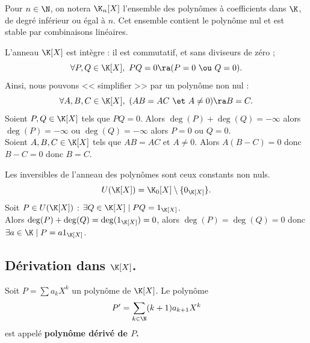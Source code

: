 \documentclass[11pt]{article}
\begin{document}
\vspace*{-0.8cm}

\begin{corr}{}{}
    Pour $n\in\N$, on notera $\K_n[X]$ l'ensemble des polynômes à coefficients dans $\K$, de degré inférieur ou égal à $n$. Cet ensemble contient le polynôme nul et est stable par combinaisons linéaires.
\end{corr}

\vspace*{-0.8cm}

\begin{corr}{}{}
    L'anneau $\K[X]$ est intègre : il est commutatif, et sans diviseurs de zéro ;
    \begin{equation*}
        \forall P,Q\in\K[X], ~ PQ=0 \ra (P=0 ~\ou~ Q=0).
    \end{equation*}
    Ainsi, nous pouvons << simplifier >> par un polynôme non nul :
    \begin{equation*}
        \forall A,B,C\in\K[X], ~ (AB=AC ~\et~ A\neq0) \ra B=C.
    \end{equation*}
    \tcblower
    Soient $P,Q\in\K[X]$ tels que $PQ=0$. Alors $\deg(P)+\deg(Q)=-\infty$ alors $\deg(P)=-\infty$ ou $\deg(Q)=-\infty$ alors $P=0$ ou $Q=0$.\\
    Soient $A,B,C\in\K[X]$ tels que $AB=AC$ et $A\neq0$. Alors $A(B-C)=0$ donc $B-C=0$ donc $B=C$.
\end{corr}

\begin{corr}{Les inversibles de l'anneau des polynômes sont ceux constants non nuls.}{}
    \begin{equation*}
        U(\K[X])=\K_0[X]\setminus\{0_{\K[X]}\}.
    \end{equation*}
    \tcblower
    Soit $P\in U(\K[X])$ : $\exists Q \in \K[X] \mid PQ=1_{\K[X]}$.\\
    Alors $\deg(P)+\deg(Q)=\deg(1_{\K[X]})=0$, alors $\deg(P)=\deg(Q)=0$ donc $\exists a \in \K \mid P=a1_{\K[X]}$.
\end{corr}

\vspace*{-0.8cm}

\subsection{Dérivation dans \texorpdfstring{$\K[X]$}{Lg}.}

\begin{defi}{}{}
    Soit $P=\sum a_kX^k$ un polynôme de $\K[X]$. Le polynôme
    \begin{equation*}
        P'=\sum_{k\in\N}(k+1)a_{k+1}X^k
    \end{equation*}
    est appelé \bf{polynôme dérivé} de $P$.
\end{defi}
\end{document}

